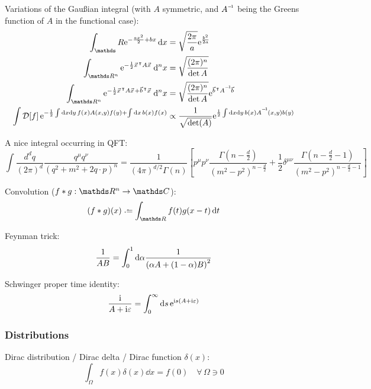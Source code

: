 			\noindent
			Variations of the Gaußian integral (with $A$ symmetric, and $\inv{A}$ being the Greens function of $A$ in the functional case):
			\begin{equation}
				\begin{aligned}
					\int_\reals \ex^{-\frac{a x^2}{2}+ b x}\dd{x} &= \sqrt{\frac{2\pi}{a}} \ex^{\frac{b^2}{2 a}}\\
					\int_{\reals ^n} \ex^{-\frac{1}{2} \vec{x}^\trp A \vec{x}}\dd[n]{x}
					&= \sqrt{\frac{(2\pi)^n}{\det A}}\\
					\int_{\reals ^n} \ex^{-\frac{1}{2} \vec{x}^\trp A \vec{x} + \vec{b}^\trp \vec{x}}\dd[n]{x}
					&= \sqrt{\frac{(2\pi)^n}{\det A}} \ex^{\vec{b}^\trp \inv{A} \vec{b}}\\
					\int \mathcal{D}\qty[f]\, \ex^{-\frac{1}{2} \int \dd x \dd y \, f(x) A(x, y) f(y) + \int \dd x\,b(x)f(x)}
					&\propto \frac{1}{\sqrt{\det(A)}}\ex^{\frac{1}{2} \int \dd x \dd y \, b(x) \inv{A}(x,y) b(y)}
				\end{aligned}
			\end{equation}

			\noindent
			A nice integral occurring in QFT:
			\begin{equation}
				\int\frac{d^{d}q}{(2\pi)^{d}}\frac{q^{\mu}q^{\nu}}{(q^{2}+m^{2}+2q\cdot p)^{n}}=\frac{1}{(4\pi)^{d/2}\Gamma(n)}\left[p^{\mu}p^{\nu}\frac{\Gamma(n-\frac{d}{2})}{(m^{2}-p^{2})^{n-\frac{d}{2}}}+\frac{1}{2}\delta^{\mu\nu}\frac{\Gamma(n-\frac{d}{2}-1)}{(m^{2}-p^{2})^{n-\frac{d}{2}-1}}\right]
			\end{equation}

			\noindent
			Convolution ($f*g:\reals ^n \to \complex $):
			\begin{equation}
				(f*g)(x) \defeq \int_{\reals} f(t) g(x-t)\dd{t}
			\end{equation}

			\noindent
			Feynman trick:
			\begin{equation}
				\frac{1}{AB} = \int_0^1 \dd\alpha \frac{1}{\qty(\alpha A + (1-\alpha)B)^2}
			\end{equation}

			\noindent
			Schwinger proper time identity:
			\begin{equation}
				\frac{\mathrm{i}}{A+\mathrm{i} \varepsilon} = \int_0^\infty \dd{s} \mathrm{e}^{\mathrm{i} s( A + \mathrm{i} \varepsilon)}
			\end{equation}

		\subsubsection{Distributions}
			\noindent
			Dirac distribution / Dirac delta / Dirac function $\delta(x)$:
			\begin{equation}
				\int_\Omega f(x)\delta(x)\dd{x} = f(0)\quad\forall\, \Omega\ni 0
			\end{equation}

